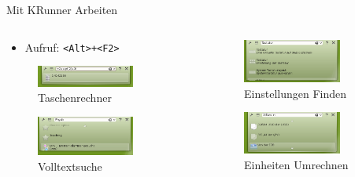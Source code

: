 \begin{frame}{Mit KRunner Arbeiten}
  \begin{columns}
    \begin{column}{0.5\textwidth}
      \begin{itemize}
        \item Aufruf: \texttt{<Alt>+<F2>}
      \end{itemize}
      \begin{figure}
        \includegraphics[keepaspectratio=true,width=0.75\textwidth]{krunner}
        \caption{Taschenrechner}
      \end{figure}  
      \begin{figure}
        \includegraphics[keepaspectratio=true,width=0.75\textwidth]{krunner2}
        \caption{Volltextsuche}
      \end{figure}
    \end{column}
    \begin{column}{0.5\textwidth}
      \begin{figure}
        \includegraphics[keepaspectratio=true,width=0.75\textwidth]{krunner3}
        \caption{Einstellungen Finden}
      \end{figure}  
      \begin{figure}
        \includegraphics[keepaspectratio=true,width=0.75\textwidth]{krunner4}
        \caption{Einheiten Umrechnen}
      \end{figure}
    \end{column}
  \end{columns}

\end{frame}




